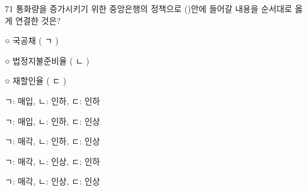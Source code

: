 \begin{question}{71}
통화량을 증가시키기 위한 중앙은행의 정책으로 (\quad )안에 들어갈 내용을 순서대로 옳게 연결한 것은?
\begin{framedtext}
○ 국공채 ( ㄱ ) \par
○ 법정지불준비율 ( ㄴ ) \par
○ 재할인율 ( ㄷ ) \par
\end{framedtext}
\begin{choices}
  \item ㄱ: 매입, ㄴ: 인하, ㄷ: 인하
  \item ㄱ: 매입, ㄴ: 인하, ㄷ: 인상
  \item ㄱ: 매각, ㄴ: 인하, ㄷ: 인상
  \item ㄱ: 매각, ㄴ: 인상, ㄷ: 인하
  \item ㄱ: 매각, ㄴ: 인상, ㄷ: 인상
\end{choices}
\end{question}
